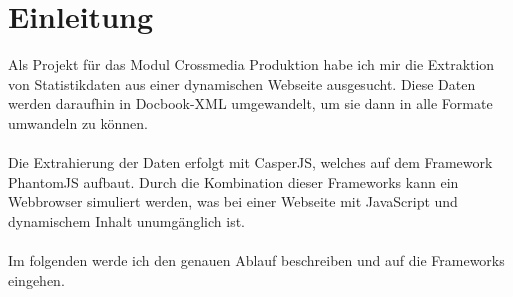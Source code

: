 \part*{Einleitung}
Als Projekt f\"ur das Modul Crossmedia Produktion habe ich mir die Extraktion von Statistikdaten aus einer dynamischen Webseite ausgesucht.
Diese Daten werden daraufhin in Docbook-XML umgewandelt, um sie dann in alle Formate umwandeln zu k\"onnen.\\
\\
Die Extrahierung der Daten erfolgt mit CasperJS, welches auf dem Framework PhantomJS aufbaut.
Durch die Kombination dieser Frameworks kann ein Webbrowser simuliert werden, was bei einer Webseite mit JavaScript und dynamischem Inhalt unumg\"anglich ist.\\
\\
Im folgenden werde ich den genauen Ablauf beschreiben und auf die Frameworks eingehen.

